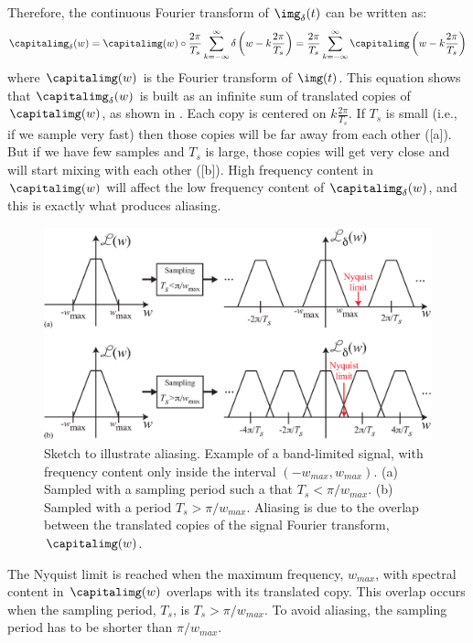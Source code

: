 Therefore, the continuous Fourier transform of $\img_{\delta} (t)$ can be written as:
\begin{equation}
    \capitalimg_{\delta} (w) = \capitalimg(w) \circ \frac{2\pi}{T_s} \sum_{k=-\infty}^{\infty} \delta \left(w-k \frac{2 \pi}{T_s} \right) = \frac{2\pi}{T_s} \sum_{k=-\infty}^{\infty} \capitalimg \left(w-k \frac{2 \pi}{T_s} \right)
\end{equation}
where $\capitalimg(w)$ is the Fourier transform of $\img(t)$. This equation shows that $\capitalimg_{\delta} (w)$ is built as an infinite sum of translated copies of $\capitalimg(w)$, as shown in . Each copy is centered on $k \frac{2 \pi}{T_s}$. If $T_s$ is small (i.e., if we sample very fast) then those copies will be far away from each other (\fig{\ref{fig:sketch_aliasing}}[a]). But if we have few samples and $T_s$ is large, those copies will get very close and will start mixing with each other (\fig{\ref{fig:sketch_aliasing}}[b]). High frequency content in $\capitalimg(w)$ will affect the low frequency content of $\capitalimg_{\delta} (w)$, and this is exactly what produces aliasing.

\begin{figure}[t]
    \centerline{
        \includegraphics[width=1\linewidth]{figures/Image_processing_sampling/sketch_aliasing.eps}
    }
    \caption{Sketch to illustrate aliasing. Example of a band-limited signal, with frequency content only inside the interval $(-w_{max}, w_{max})$. (a) Sampled with a sampling period such a that $T_s < \pi/w_{max}$. (b) Sampled with a period $T_s > \pi/w_{max}$. Aliasing is due to the overlap between the translated copies of the signal Fourier transform, $\capitalimg(w)$.}
    \label{fig:sketch_aliasing}
\end{figure}

The Nyquist limit
is reached when the maximum frequency, $w_{max}$, with spectral content in $\capitalimg (w)$ overlaps with its translated copy. This overlap occurs when the sampling period, $T_s$, is $T_s > \pi/w_{max}$. To avoid aliasing, the sampling period has to be shorter than $\pi/w_{max}$.



